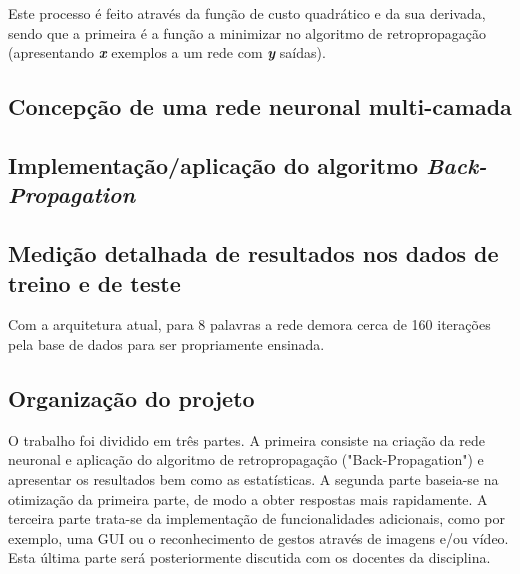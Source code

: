 \documentclass[10pt,a4paper]{article}
\begin{document}
Este processo é feito através da função de custo quadrático e da sua derivada, sendo que a primeira é a função a minimizar no algoritmo de retropropagação (apresentando \textbf{\textit{x}} exemplos a um rede com \textbf{\textit{y}} saídas).































\subsection{Concepção de uma rede neuronal multi-camada}
\subitem



\subsection{Implementação/aplicação do algoritmo \textit{Back-Propagation}}
\subitem




\subsection{Medição detalhada de resultados nos dados de treino e de teste}
\subitem

Com a arquitetura atual, para 8 palavras a rede demora cerca de 160 iterações pela base de dados para ser propriamente ensinada.

\subsection{Organização do projeto}
\subitem

O trabalho foi dividido em três partes. 
A primeira consiste na criação da rede neuronal e aplicação do algoritmo de retropropagação ("Back-Propagation") e apresentar os resultados bem como as estatísticas.
A segunda parte baseia-se na otimização da primeira parte, de modo a obter respostas mais rapidamente.
A terceira parte trata-se da implementação de funcionalidades adicionais, como por exemplo, uma GUI ou o reconhecimento de gestos através de imagens e/ou vídeo. Esta última parte será posteriormente discutida com os docentes da disciplina.
\end{document}
